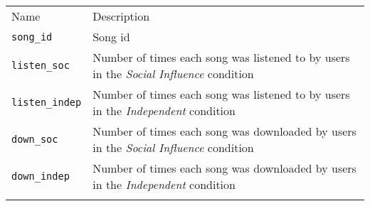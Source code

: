 \documentclass[]{article}
\begin{document}
\begin{longtable}[c]{@{}ll@{}}
\toprule\addlinespace
\begin{minipage}[b]{0.19\columnwidth}\raggedright
Name
\end{minipage} & \begin{minipage}[b]{0.75\columnwidth}\raggedright
Description
\end{minipage}
\\\addlinespace
\midrule\endhead
\begin{minipage}[t]{0.19\columnwidth}\raggedright
\texttt{song\_id}
\end{minipage} & \begin{minipage}[t]{0.75\columnwidth}\raggedright
Song id
\end{minipage}
\\\addlinespace
\begin{minipage}[t]{0.19\columnwidth}\raggedright
\texttt{listen\_soc}
\end{minipage} & \begin{minipage}[t]{0.75\columnwidth}\raggedright
Number of times each song was listened to by users in the \emph{Social
Influence} condition
\end{minipage}
\\\addlinespace
\begin{minipage}[t]{0.19\columnwidth}\raggedright
\texttt{listen\_indep}
\end{minipage} & \begin{minipage}[t]{0.75\columnwidth}\raggedright
Number of times each song was listened to by users in the
\emph{Independent} condition
\end{minipage}
\\\addlinespace
\begin{minipage}[t]{0.19\columnwidth}\raggedright
\texttt{down\_soc}
\end{minipage} & \begin{minipage}[t]{0.75\columnwidth}\raggedright
Number of times each song was downloaded by users in the \emph{Social
Influence} condition
\end{minipage}
\\\addlinespace
\begin{minipage}[t]{0.19\columnwidth}\raggedright
\texttt{down\_indep}
\end{minipage} & \begin{minipage}[t]{0.75\columnwidth}\raggedright
Number of times each song was downloaded by users in the
\emph{Independent} condition
\end{minipage}
\\\addlinespace
\bottomrule
\end{longtable}
\end{document}
